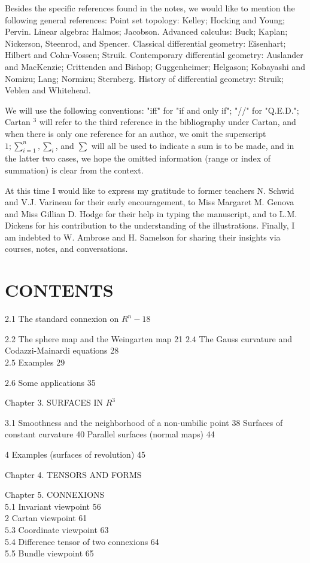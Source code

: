 \documentclass[10pt]{article}
\begin{document}
Besides the specific references found in the notes, we would like to mention the following general references: Point set topology: Kelley; Hocking and Young; Pervin. Linear algebra: Halmos; Jacobson. Advanced calculus: Buck; Kaplan; Nickerson, Steenrod, and Spencer. Classical differential geometry: Eisenhart; Hilbert and Cohn-Vossen; Struik. Contemporary differential geometry: Auslander and MacKenzie; Crittenden and Bishop; Guggenheimer; Helgason; Kobayashi and Nomizu; Lang; Normizu; Sternberg. History of differential geometry: Struik; Veblen and Whitehead.

We will use the following conventions: "iff" for "if and only if"; "//" for "Q.E.D."; Cartan ${ }^{3}$ will refer to the third reference in the bibliography under Cartan, and when there is only one reference for an author, we omit the superscript $1 ; \sum_{i=1}^{n}, \sum_{i}$, and $\sum$ will all be used to indicate a sum is to be made, and in the latter two cases, we hope the omitted information (range or index of summation) is clear from the context.

At this time I would like to express my gratitude to former teachers N. Schwid and V.J. Varineau for their early encouragement, to Miss Margaret M. Genova and Miss Gillian D. Hodge for their help in typing the manuscript, and to L.M. Dickens for his contribution to the understanding of the illustrations. Finally, I am indebted to W. Ambrose and H. Samelson for sharing their insights via courses, notes, and conversations.

\section{CONTENTS}
2.1 The standard connexion on $R^{n}-18$

2.2 The sphere map and the Weingarten map 21 $2.4$ The Gauss curvature and Codazzi-Mainardi equations 28\\
$2.5$ Examples 29

$2.6$ Some applications 35

Chapter 3. SURFACES IN $R^{3}$

3.1 Smoothness and the neighborhood of a non-umbilic point 38 Surfaces of constant curvature 40 Parallel surfaces (normal maps) 44

4 Examples (surfaces of revolution) 45

Chapter 4. TENSORS AND FORMS

Chapter 5. CONNEXIONS\\
5.1 Invariant viewpoint 56\\
2 Cartan viewpoint 61\\
$5.3$ Coordinate viewpoint 63\\
5.4 Difference tensor of two connexions 64\\
5.5 Bundle viewpoint 65
\end{document}

